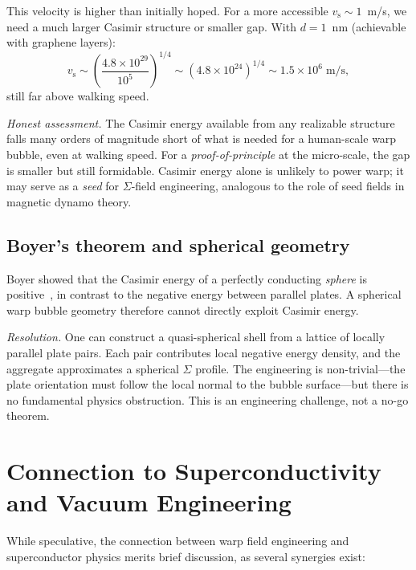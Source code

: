 \documentclass[prd,twocolumn,superscriptaddress,longbibliography]{revtex4-2}
\newcommand{\vs}{v_{\mathrm{s}}}
\begin{document}
This velocity is higher than initially hoped.  For a more
accessible $\vs \sim 1$~m/s, we need a much larger
Casimir structure or smaller gap.  With $d = 1$~nm (achievable
with graphene layers):
\begin{equation}
\vs \sim \left(\frac{4.8\times 10^{29}}{10^5}\right)^{1/4}
\sim (4.8\times 10^{24})^{1/4} \sim 1.5\times 10^{6}\;\mathrm{m/s},
\end{equation}
still far above walking speed.

\textit{Honest assessment.}\;  The Casimir energy available from
any realizable structure falls many orders of magnitude short of
what is needed for a human-scale warp bubble, even at walking speed.
For a \emph{proof-of-principle} at the micro-scale, the gap is
smaller but still formidable.  Casimir energy alone is unlikely to
power warp; it may serve as a \emph{seed} for $\Sigma$-field
engineering, analogous to the role of seed fields in magnetic
dynamo theory.

\subsection{Boyer's theorem and spherical geometry}

Boyer showed that the Casimir energy of a perfectly conducting
\emph{sphere} is positive~\cite{Boyer1968}, in contrast to the
negative energy between parallel plates.  A spherical warp bubble
geometry therefore cannot directly exploit Casimir energy.

\textit{Resolution.}\;  One can construct a quasi-spherical shell
from a lattice of locally parallel plate pairs.  Each pair
contributes local negative energy density, and the aggregate
approximates a spherical $\Sigma$ profile.  The engineering is
non-trivial---the plate orientation must follow the local normal
to the bubble surface---but there is no fundamental physics
obstruction.  This is an engineering challenge, not a no-go
theorem.

\section{Connection to Superconductivity and Vacuum Engineering}
\label{sec:SC}

While speculative, the connection between warp field engineering
and superconductor physics merits brief discussion, as several
synergies exist:
\end{document}
